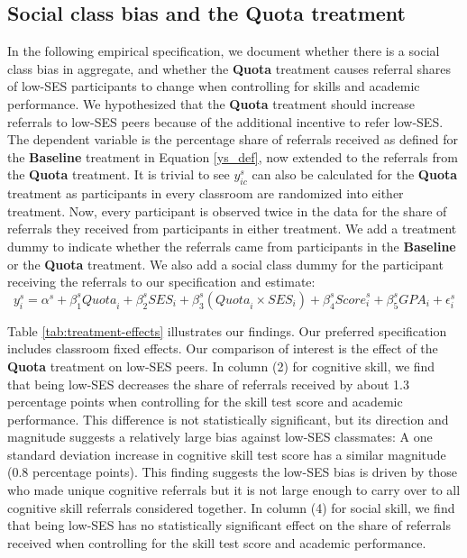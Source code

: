 \documentclass[11pt,a4paper,oneside]{article}
\begin{document}
 \subsection{Social class bias and the Quota treatment}
 In the following empirical specification, we document whether there is a social class bias in aggregate, and whether the \textbf{Quota} treatment causes referral shares of low-SES participants to change when controlling for skills and academic performance. We hypothesized that the \textbf{Quota} treatment should increase referrals to low-SES peers because of the additional incentive to refer low-SES. The dependent variable is the percentage share of referrals received as defined for the \textbf{Baseline} treatment in Equation \ref{ys_def}, now extended to the referrals from the \textbf{Quota} treatment. It is trivial to see $y_{ic}^{s}$ can also be calculated for the \textbf{Quota} treatment as participants in every classroom are randomized into either treatment. Now, every participant is observed twice in the data for the share of referrals they received from participants in either treatment. We add a treatment dummy to indicate whether the referrals came from participants in the \textbf{Baseline} or the \textbf{Quota} treatment. We also add a social class dummy for the participant receiving the referrals to our specification and estimate:
  \begin{equation}\label{treat-ses-int}
y_{i}^{s} = \alpha^{s} + \beta_1^{s}{Quota}_{i} + \beta_2^{s}{SES}_{i} + \beta_3^{s}({Quota}_{i} \times {SES}_{i}) + \beta_{4}^{s}{Score}_{i}^{s} + \beta_5^{s}{GPA}_{i} + \epsilon_{i}^{s}
\end{equation}
  
Table \ref{tab:treatment-effects} illustrates our findings. Our preferred specification includes classroom fixed effects. Our comparison of interest is the effect of the \textbf{Quota} treatment on low-SES peers. In column (2) for cognitive skill, we find that being low-SES decreases the share of referrals received by about 1.3 percentage points when controlling for the skill test score and academic performance. This difference is not statistically significant, but its direction and magnitude suggests a relatively large bias against low-SES classmates: A one standard deviation increase in cognitive skill test score has a similar magnitude (0.8 percentage points). This finding suggests the low-SES bias is driven by those who made unique cognitive referrals but it is not large enough to carry over to all cognitive skill referrals considered together. In column (4) for social skill, we find that being low-SES has no statistically significant effect on the share of referrals received when controlling for the skill test score and academic performance.
\end{document}

